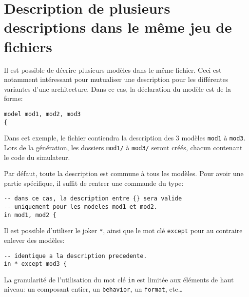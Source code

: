 \section{Description de plusieurs descriptions dans le même jeu de fichiers}
\label{sec:plusieursModeles}
Il est possible de décrire plusieurs modèles dans le même fichier. Ceci est notamment intéressant pour mutualiser une description pour les différentes variantes d'une architecture.
Dans ce cas, la déclaration du modèle est de la forme:
\begin{lstlisting}
model mod1, mod2, mod3 
{
\end{lstlisting}
Dans cet exemple, le fichier contiendra la description des 3 modèles \texttt{mod1} à \texttt{mod3}. Lors de la génération, les dossiers \texttt{mod1/} à \texttt{mod3/} seront créés, chacun contenant le code du simulateur.

Par défaut, toute la description est commune à tous les modèles. Pour avoir une partie spécifique, il suffit de rentrer une commande du type:
\begin{lstlisting}
-- dans ce cas, la description entre {} sera valide 
-- uniquement pour les modeles mod1 et mod2.
in mod1, mod2 { 
\end{lstlisting}
Il est possible d'utiliser le joker \texttt{*}, ainsi que le mot clé \texttt{except} pour au contraire enlever des modèles:
\begin{lstlisting}
-- identique a la description precedente.
in * except mod3 { 
\end{lstlisting}

La granularité de l'utilisation du mot clé \texttt{in} est limitée aux éléments de haut niveau: un composant entier, un \texttt{behavior}, un \texttt{format}, etc\ldots
